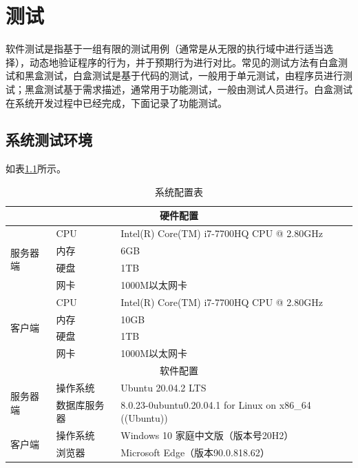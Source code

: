 \chapter{测试}
\label{测试}

软件测试是指基于一组有限的测试用例（通常是从无限的执行域中进行适当选择），动态地验证程序的行为，并于预期行为进行对比\cite{.software}。常见的测试方法有白盒测试和黑盒测试，白盒测试是基于代码的测试，一般用于单元测试，由程序员进行测试；黑盒测试基于需求描述，通常用于功能测试，一般由测试人员进行。白盒测试在系统开发过程中已经完成，下面记录了功能测试。

\section{系统测试环境}

如表\ref{test-system}所示。

\begin{table}[htbp]
  \centering
  \song\wuhao
  \caption{系统配置表}
  \label{test-system}
\begin{tabular}{lll}
\hline
\multicolumn{3}{c}{硬件配置}                                                                 \\ \hline
\multirow{4}{*}{服务器端} & CPU    & Intel(R) Core(TM) i7-7700HQ CPU @ 2.80GHz               \\
                      & 内存     & 6GB                                                     \\
                      & 硬盘     & 1TB                                                     \\
                      & 网卡     & 1000M以太网卡                                               \\ \hline
\multirow{4}{*}{客户端}  & CPU    & Intel(R) Core(TM) i7-7700HQ CPU @ 2.80GHz               \\
                      & 内存     & 10GB                                                    \\
                      & 硬盘     & 1TB                                                     \\
                      & 网卡     & 1000M以太网卡                                               \\ \hline
\multicolumn{3}{c}{软件配置}                                                                 \\ \hline
\multirow{2}{*}{服务器端} & 操作系统   & Ubuntu 20.04.2 LTS                                      \\
                      & 数据库服务器 & 8.0.23-0ubuntu0.20.04.1 for Linux on x86\_64 ((Ubuntu)) \\ \hline
\multirow{2}{*}{客户端}  & 操作系统   & Windows 10 家庭中文版（版本号20H2）                               \\
                      & 浏览器    & Microsoft Edge（版本90.0.818.62）                           \\ \hline
\end{tabular}
\end{table}

